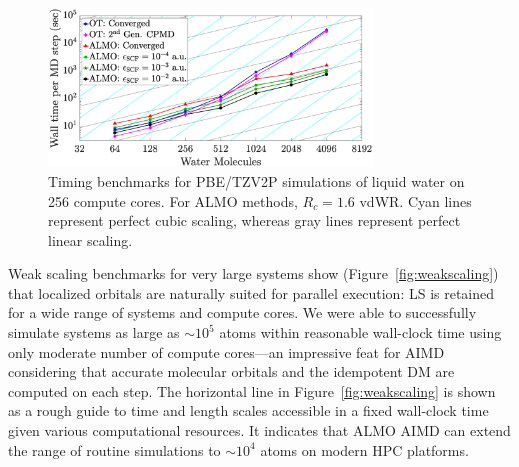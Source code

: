 \documentclass[aip,jcp,reprint,amsmath,amssymb]{revtex4-1}
\begin{document}

\begin{figure}
\includegraphics[trim={2.5cm 0.5cm 3.4cm 0.9cm},clip,width=8.6cm]{3.eps}
\caption{\label{fig:strongscaling_log} Timing benchmarks for PBE/TZV2P simulations of liquid water on 256 compute cores. 
For ALMO methods, $R_{c} = 1.6$ vdWR. 
Cyan lines represent perfect cubic scaling, whereas gray lines represent perfect linear scaling. 
}
\end{figure}


Weak scaling benchmarks for very large systems show (Figure~\ref{fig:weakscaling}) that localized orbitals are naturally suited for parallel execution: LS is retained for a wide range of systems and compute cores. 
We were able to successfully simulate systems as large as $\sim10^{5}$ atoms 
within reasonable wall-clock time using only moderate number of compute cores---an impressive feat for AIMD considering that accurate molecular orbitals and the idempotent DM are computed on each step.
The horizontal line in Figure~\ref{fig:weakscaling} is shown as a rough guide to time and length scales accessible in a fixed wall-clock time given various computational resources. It indicates that ALMO AIMD can extend the range of routine simulations to $\sim10^4$ atoms on modern HPC platforms. 


\end{document}
